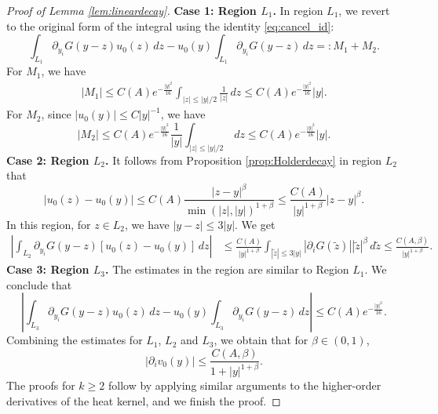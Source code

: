 \documentclass[12pt]{amsart}
\numberwithin{equation}{section}              %
\theoremstyle{remark}
\begin{document}
\begin{proof}[Proof of Lemma \ref{lem:lineardecay}]
	\textbf{Case 1: Region $L_1$.} In  region $L_1$, we revert to the original form of the integral using the identity \eqref{eq:cancel_id}:
			\begin{equation*}
				\int_{L_1} \partial_{y_i} G(y-z) u_0(z) \, dz - u_0(y) \int_{L_1} \partial_{y_i} G(y-z) \, dz =: M_1 + M_2.
			\end{equation*}
            For $M_1$, we have
            \begin{equation*}
                \begin{aligned}
                 |M_1|    \leq C(A) e^{-\frac{|y|^2}{16}} \int_{|z| \leq |y|/2} \frac{1}{|z|}\, dz \leq C(A) e^{-\frac{|y|^2}{16}} |y|.
                \end{aligned}
            \end{equation*}
			For $M_2$, since $|u_0(y)| \leq C|y|^{-1}$, 
            we have
			\begin{equation*}
				|M_2| \leq C(A) e^{-\frac{|y|^2}{16}}\frac{1}{|y|} \int_{|z| \leq |y|/2} \, dz \leq C(A) e^{-\frac{|y|^2}{16}} |y|.
			\end{equation*}
            \textbf{Case 2: Region $L_2$.} 
            It follows from Proposition \ref{prop:Holderdecay} in region $L_2$ that
			\begin{equation*}
				|u_0(z) - u_0(y)| \le C(A) \frac{|z-y|^\beta}{\min(|z|, |y|)^{1+\beta}} \leq \frac{C(A)}{|y|^{1+\beta}} |z-y|^\beta.
			\end{equation*}
            In this region, for $z \in L_2$, we have $|y-z|\leq  3|y|$. 
			We get  
			\begin{equation*}
				\begin{aligned}
					\left| \int_{L_2} \partial_{y_i} G(y-z) [u_0(z) - u_0(y)] \, dz \right| 
					&\leq \frac{C(A)}{|y|^{1+\beta}} \int_{|\tilde{z}| \leq 3|y|} |\partial_i G(\tilde{z}) ||\tilde{z}|^{\beta}  \, d\tilde{z} 
					\leq \frac{C(A,\beta)}{|y|^{1+\beta}}.
				\end{aligned}
			\end{equation*}
\textbf{Case 3: Region $L_3$.} The estimates in the region are similar to Region $L_1$. We conclude that
\begin{equation*}
				\left|\int_{L_3} \partial_{y_i} G(y-z) u_0(z) \, dz - u_0(y) \int_{L_3} \partial_{y_i} G(y-z) \, dz\right| \leq C(A) e^{-\frac{|y|^2}{16}}.
			\end{equation*}	
			Combining the estimates for $L_1$, $L_2$ and $L_3$, we obtain that for $\beta \in (0, 1)$,
			\begin{equation*}
				|\partial_i v_0(y)| \leq \frac{C(A,\beta)}{1+|y|^{1+\beta}}.
			\end{equation*}
			The proofs for $k \geq 2$ follow by applying similar  arguments
            to the higher-order derivatives of the heat kernel, and we finish the proof. 
\end{proof}
\end{document}
